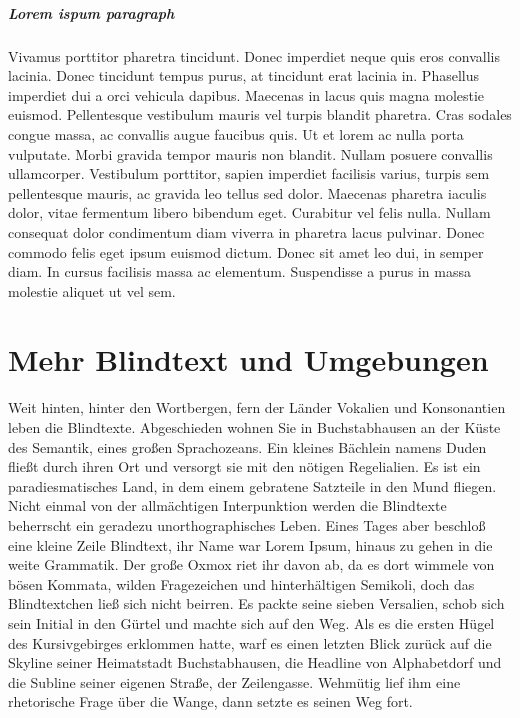 \documentclass[a4paper,parskip=half,oneside]{scrbook}
\begin{document}
\paragraph{Lorem ispum paragraph}
Vivamus porttitor pharetra tincidunt. Donec imperdiet neque quis eros convallis lacinia. Donec tincidunt tempus purus, at tincidunt erat lacinia in. Phasellus imperdiet dui a orci vehicula dapibus. Maecenas in lacus quis magna molestie euismod. Pellentesque vestibulum mauris vel turpis blandit pharetra. Cras sodales congue massa, ac convallis augue faucibus quis. Ut et lorem ac nulla porta vulputate. Morbi gravida tempor mauris non blandit. Nullam posuere convallis ullamcorper. Vestibulum porttitor, sapien imperdiet facilisis varius, turpis sem pellentesque mauris, ac gravida leo tellus sed dolor. Maecenas pharetra iaculis dolor, vitae fermentum libero bibendum eget. Curabitur vel felis nulla. Nullam consequat dolor condimentum diam viverra in pharetra lacus pulvinar. Donec commodo felis eget ipsum euismod dictum. Donec sit amet leo dui, in semper diam. In cursus facilisis massa ac elementum. Suspendisse a purus in massa molestie aliquet ut vel sem.  \chapter{Mehr Blindtext und Umgebungen} Weit hinten, hinter den Wortbergen, fern der Länder Vokalien und Konsonantien leben die Blindtexte. Abgeschieden wohnen Sie in Buchstabhausen an der Küste des Semantik, eines großen Sprachozeans. Ein kleines Bächlein namens Duden fließt durch ihren Ort und versorgt sie mit den nötigen Regelialien. Es ist ein paradiesmatisches Land, in dem einem gebratene Satzteile in den Mund fliegen. Nicht einmal von der allmächtigen Interpunktion werden die Blindtexte beherrscht ein geradezu unorthographisches Leben. Eines Tages aber beschloß eine kleine Zeile Blindtext, ihr Name war Lorem Ipsum, hinaus zu gehen in die weite Grammatik. Der große Oxmox riet ihr davon ab, da es dort wimmele von bösen Kommata, wilden Fragezeichen und hinterhältigen Semikoli, doch das Blindtextchen ließ sich nicht beirren. Es packte seine sieben Versalien, schob sich sein Initial in den Gürtel und machte sich auf den Weg. Als es die ersten Hügel des Kursivgebirges erklommen hatte, warf es einen letzten Blick zurück auf die Skyline seiner Heimatstadt Buchstabhausen, die Headline von Alphabetdorf und die Subline seiner eigenen Straße, der Zeilengasse. Wehmütig lief ihm eine rhetorische Frage über die Wange, dann setzte es seinen Weg fort.
\end{document}
